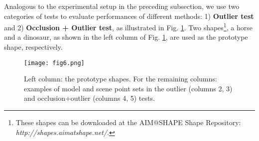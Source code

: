 \documentclass[11pt,bezier,]{article}
\begin{document}
Analogous  to the experimental setup in  the preceding subsection,
we use two categories  of tests to evaluate  performances of different methods:
1) \textbf{Outlier test} and
2) \textbf{Occlusion + Outlier test},
as illustrated in  Fig. \ref{nonrot_3D_test_data_exa}.
Two shapes\footnote{These shapes can be downloaded at %
the  AIM@SHAPE Shape Repository: \textit{http://shapes.aimatshape.net/}.}, a horse  and a  dinosaur, 
as shown in the left column of Fig.  \ref{nonrot_3D_test_data_exa},
are used as the prototype shape, respectively.



\begin{figure}[ht]

\texttt{[image: fig6.png]}


% 
\caption{
Left column: the prototype shapes. 
For the remaining columns: 
examples of model and scene point sets in the  outlier (columns 2, 3)
and  occlusion+outlier (columns 4, 5) tests.
\label{nonrot_3D_test_data_exa}}
\end{figure}
\end{document}
